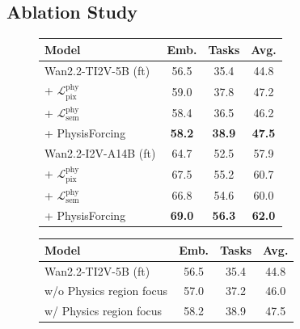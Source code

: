\subsection{Ablation Study}
\label{sec:ablation}

\begin{figure}[t]
\centering
\footnotesize
\setlength{\tabcolsep}{4pt}
\renewcommand{\arraystretch}{1.0}
\begin{minipage}[t]{0.47\linewidth}
\vspace{0pt}
\centering
{}
\label{tab:ablation_R-Bench}
\begin{tabular}{lccc}
\toprule
\textbf{Model} & \textbf{Emb.} & \textbf{Tasks} & \textbf{Avg.} \\
\midrule
Wan2.2-TI2V-5B (ft) & 56.5 & 35.4 & 44.8 \\
\quad + $\mathcal{L}^{\mathrm{phy}}_{\mathrm{pix}}$ & 59.0 & 37.8 & 47.2 \\
\quad + $\mathcal{L}^{\mathrm{phy}}_{\mathrm{sem}}$ & 58.4 & 36.5 & 46.2 \\
\quad + PhysisForcing & \textbf{58.2} & \textbf{38.9} & \textbf{47.5} \\
\midrule
Wan2.2-I2V-A14B (ft) & 64.7 & 52.5 & 57.9 \\
\quad + $\mathcal{L}^{\mathrm{phy}}_{\mathrm{pix}}$ & 67.5 & 55.2 & 60.7 \\
\quad + $\mathcal{L}^{\mathrm{phy}}_{\mathrm{sem}}$ & 66.8 & 54.6 & 60.0 \\
\quad + PhysisForcing & \textbf{69.0} & \textbf{56.3} & \textbf{62.0} \\
\bottomrule
\end{tabular}

\vspace{0.25em}

\label{tab:ablation_region}
\begin{tabular}{lccc}
\toprule
\textbf{Model} & \textbf{Emb.} & \textbf{Tasks} & \textbf{Avg.} \\
\midrule
Wan2.2-TI2V-5B (ft) & 56.5 & 35.4 & 44.8 \\
w/o Physics region focus & 57.0  & 37.2  & 46.0  \\
w/ Physics region focus & 58.2 & 38.9 & 47.5 \\
\bottomrule
\end{tabular}

\vspace{0.25em}


\end{minipage}
\end{figure}
